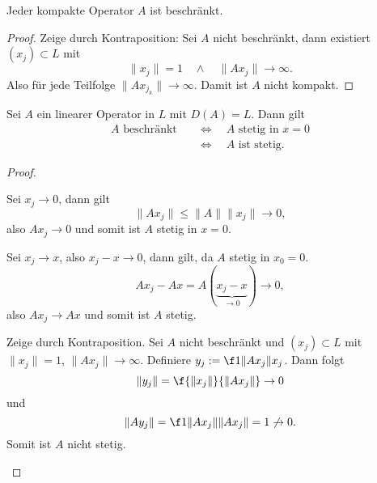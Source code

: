\begin{st} \label{1.26}
	Jeder kompakte Operator $A$ ist beschränkt.
	\begin{proof}
		Zeige durch Kontraposition:
		Sei $A$ nicht beschränkt, dann existiert $(x_j) \subset L$ mit
		\[
			\|x_j\| = 1  \quad\land\quad \|Ax_j\| \to \infty.
		\]
		Also für jede Teilfolge $\|Ax_{j_k}\| \to \infty$.
		Damit ist $A$ nicht kompakt.
	\end{proof}
\end{st}

\begin{st} \label{1.27}
	Sei $A$ ein linearer Operator in $L$ mit $D(A) = L$.
	Dann gilt
	\begin{align*}
		A \text{ beschränkt}
		&\quad\iff\quad A \text{ stetig in } x = 0 \\
		&\quad\iff\quad A \text{ ist stetig.}
	\end{align*}
	\begin{proof}
		\begin{seg}[$A$ beschränkt $\implies$ $A$ stetig in $x=0$]
			Sei $x_j \to 0$, dann gilt
			\[
				\|Ax_j\| \le \|A\| \|x_j\| \to 0,
			\]
			also $Ax_j \to 0$ und somit ist $A$ stetig in $x=0$.
		\end{seg}
		\begin{seg}[$A$ stetig in $x_0=0$ $\implies$ $A$ stetig]
			Sei $x_j \to x$, also $x_j - x \to 0$, dann gilt, da $A$ stetig in $x_0=0$.
			\[
				Ax_j - Ax = A(\underbrace{x_j - x}_{\to 0}) \to 0,
			\]
			also $Ax_j \to Ax$ und somit ist $A$ stetig.
		\end{seg}
		\begin{seg}
			Zeige durch Kontraposition.
			Sei $A$ nicht beschränkt und $(x_j) \subset L$ mit $\|x_j\| = 1$, $\|Ax_j\| \to \infty$.
			Definiere $y_j := \f 1{\|Ax_j\|}x_j$.
			Dann folgt
			\[
				\|y_j\| = \f {\|x_j\|}{\|Ax_j\|} \to 0
			\]
			und
			\[
				\|Ay_j\| = \f 1{\|Ax_j\|} \|Ax_j\| = 1 \not\to 0.
			\]
			Somit ist $A$ nicht stetig.
		\end{seg}
	\end{proof}
\end{st}

